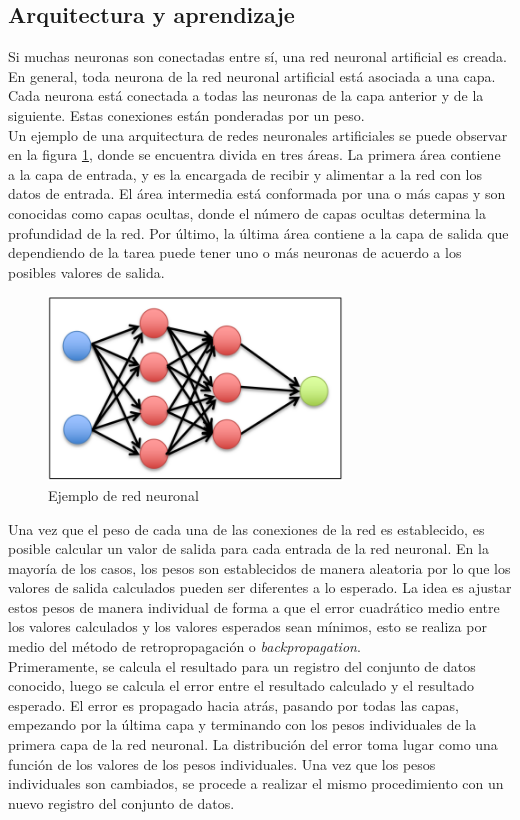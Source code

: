 \subsection{Arquitectura y aprendizaje}
Si muchas neuronas son conectadas entre sí, una red neuronal artificial es creada. En general, toda neurona de la red neuronal artificial está asociada a una capa. Cada neurona está conectada a todas las neuronas de la capa anterior y de la siguiente. Estas conexiones están ponderadas por un peso.\\
Un ejemplo de una arquitectura de redes neuronales artificiales se puede observar en la figura \ref{fig:redNeuronal}, donde se encuentra divida en tres áreas. La primera área contiene a la capa de entrada, y es la encargada de recibir y alimentar a la red con los datos de entrada. El área intermedia está conformada por una o más capas y son conocidas como capas ocultas, donde el número de capas ocultas determina la profundidad de la red. Por último, la última área contiene a la capa de salida que dependiendo de la tarea puede tener uno o más neuronas de acuerdo a los posibles valores de salida.\\
\begin{figure}[H]
    \centering
    \includegraphics{capitulos/img/redNeuronal.png}
    \caption{Ejemplo de red neuronal}
    \label{fig:redNeuronal}
\end{figure}
Una vez que el peso de cada una de las conexiones de la red es establecido, es posible calcular un valor de salida para cada entrada de la red neuronal. En la mayoría de los casos, los pesos son establecidos de manera aleatoria por lo que los valores de salida calculados pueden ser diferentes a lo esperado. La idea es ajustar estos pesos de manera individual de forma a que el error cuadrático medio entre los valores calculados y los valores esperados sean mínimos, esto se realiza por medio del método de retropropagación o \textit{backpropagation}.\\

Primeramente, se calcula el resultado para un registro del conjunto de datos conocido, luego se calcula el error entre el resultado calculado y el resultado esperado. El error es propagado hacia atrás, pasando por todas las capas, empezando por la última capa y terminando con los pesos individuales de la primera capa de la red neuronal. La distribución del error toma lugar como una función de los valores de los pesos individuales. Una vez que los pesos individuales son cambiados, se procede a realizar el mismo procedimiento con un nuevo registro del conjunto de datos.\\

